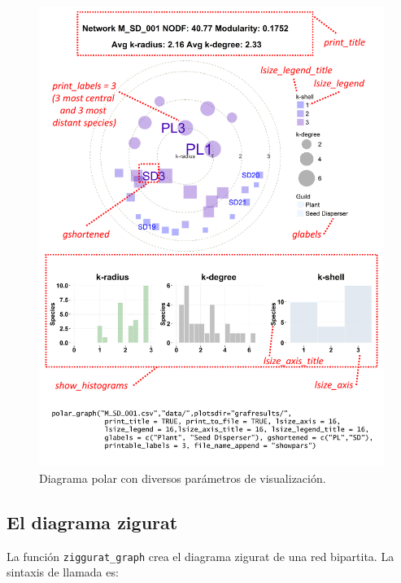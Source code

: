 \clearpage
\begin{figure}[h!]
\centering
\includegraphics[scale=0.75]{ManFigs/polar_params.pdf}
\caption {Diagrama polar con diversos parámetros de visualización.}
\label{fig:AKMAN_polar_params}
\end{figure}

\clearpage
\subsection*{El diagrama zigurat}

\noindent La función \texttt{ziggurat\_graph} crea el diagrama zigurat de una red bipartita. La sintaxis de llamada es:

